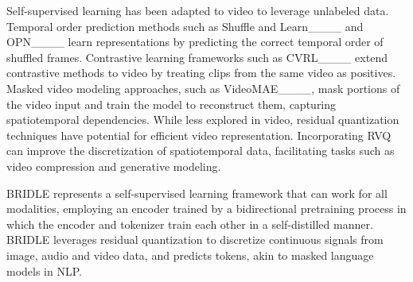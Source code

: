 Self-supervised learning has been adapted to video to leverage unlabeled data. Temporal order prediction methods such as Shuffle and Learn____ and OPN____ learn representations by predicting the correct temporal order of shuffled frames. Contrastive learning frameworks such as CVRL____ extend contrastive methods to video by treating clips from the same video as positives. Masked video modeling approaches, such as VideoMAE____, mask portions of the video input and train the model to reconstruct them, capturing spatiotemporal dependencies.
While less explored in video, residual quantization techniques have potential for efficient video representation. Incorporating RVQ can improve the discretization of spatiotemporal data, facilitating tasks such as video compression and generative modeling.

BRIDLE represents a self-supervised learning framework that can work for all modalities, employing an encoder trained by a bidirectional pretraining process in which the encoder and tokenizer train each other in a self-distilled manner. BRIDLE leverages residual quantization to discretize continuous signals from image, audio and video data, and predicts tokens, akin to masked language models in NLP.

